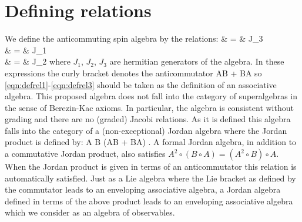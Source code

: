 \begin{comment}
The algebra of observables in quantum theory plays a fundamental
role. When classical systems are quantized, their classical
symmetry algebra acting on a set of physical observables, in
simplest examples, remains the same. For some completely
integrable non-linear models, consistent quantization requires
that the classical symmetry group be replaced by a quantum group
\cite{frt,drinfeld,woronowicz,manin} via a deformation parameter
$q = 1 + O(\hbar)$. In recent years quantum groups involving
fermions have received widespread attention. These include
deformed fermion algebras \cite{jx,xh,sm,chung}, spin chains
\cite{nt,gppr,bnnpsw} and Fermi gases \cite{ubriaco}. At the same
time, some quantum systems, most notably fermionic quantum systems
do not have any classical analogues. Nevertheless, fermions are
perhaps the most important sector of quantum phenomena. Motivated
by these considerations, we define a fermionic version of the
angular momentum algebra by the relations
\end{comment}


\section{Defining relations}

We define the anticommuting spin algebra by the relations:
\bea
{} & = & J_3 \label{eqn:defrel1} \\
 & = & J_1 \label{eqn:defrel2} \\
 & = & J_2 \label{eqn:defrel3}
\eea
where $J_1$, $J_2$, $J_3$ are hermitian generators of the algebra.
In these expressions the curly bracket denotes the anticommutator
\beq
{} \equiv AB + BA
\eeq
so \eqref{eqn:defrel1}-\eqref{eqn:defrel3} should be taken as the
definition of an associative algebra. This proposed algebra does
not fall into the category of superalgebras in the sense of
Berezin-Kac axioms. In particular, the algebra is consistent
without grading and there are no (graded) Jacobi relations. As it
is defined this algebra falls into the category of a
(non-exceptional) Jordan algebra where the Jordan product is
defined by: \beq A \circ B \equiv {} (AB + BA) \quad . \eeq A
formal Jordan algebra, in addition to a commutative Jordan
product, also satisfies $A^2\circ(B\circ A) = (A^2\circ B)\circ
A$. When the Jordan product is given in terms of an anticommutator
this relation is automatically satisfied. Just as a Lie algebra
where the Lie bracket as defined by the commutator leads to an
enveloping associative algebra, a Jordan algebra defined in terms
of the above product leads to an enveloping associative algebra
which we consider as an algebra of observables.

